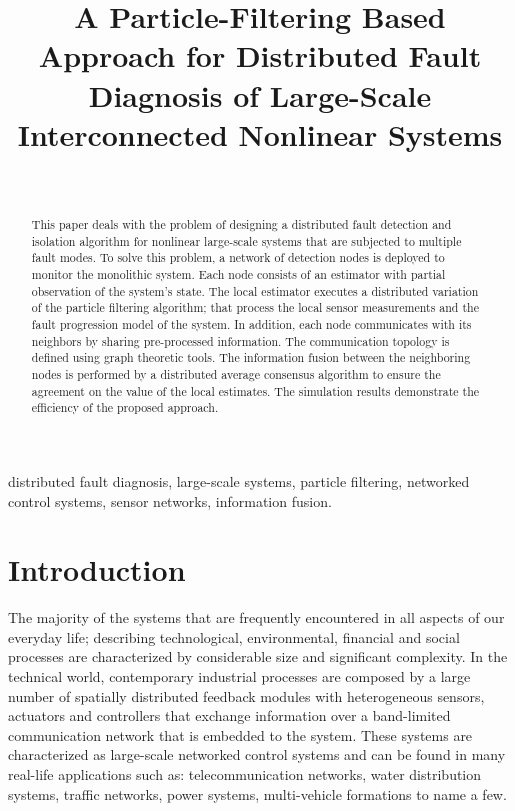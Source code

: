 \documentclass[10pt,twocolumn,twoside]{IEEEtran}
\title{A Particle-Filtering Based Approach for Distributed Fault Diagnosis of Large-Scale Interconnected Nonlinear Systems}
\author{
\authorblockN{Elaheh Noursadeghi, Ioannis Raptis}\\
\authorblockA{Mechanical Engineering Department, University of Massachusetts Lowell\\
  Email: Elaheh\_Noursadeghi, Ioannis\_Raptis@uml.edu}
}
\begin{document}
\maketitle

\begin{abstract}
This paper deals with the problem of designing a distributed fault detection and isolation algorithm for nonlinear large-scale systems that are subjected to multiple fault modes. To solve this problem, a network of detection nodes is deployed to monitor the monolithic system. Each node consists of an estimator with partial observation of the system's state. The local estimator executes a distributed variation of the particle filtering algorithm; that process the local sensor measurements and the fault progression model of the system. In addition, each node communicates with its neighbors by sharing pre-processed information. The communication topology is defined using graph theoretic tools. The information fusion between the neighboring nodes is performed by a distributed average consensus algorithm to ensure the agreement on the value of the local estimates. The simulation results demonstrate the efficiency of the proposed approach. 
\end{abstract}

\begin{keywords}
distributed fault diagnosis, large-scale systems, particle filtering, networked control systems, sensor networks, information fusion.
\end{keywords}



\section{Introduction}

The majority of the systems that are frequently encountered in all aspects of our everyday life; describing technological, environmental, financial and social processes are characterized by considerable size and significant complexity. In the technical world, contemporary industrial processes are composed by a large number of spatially distributed feedback modules with heterogeneous sensors, actuators and controllers that exchange information over a band-limited communication network that is embedded to the system. These systems are characterized as large-scale networked control systems and can be found in many real-life applications such as: telecommunication networks, water distribution systems, traffic networks, power systems, multi-vehicle formations to name a few. 
\end{document}
